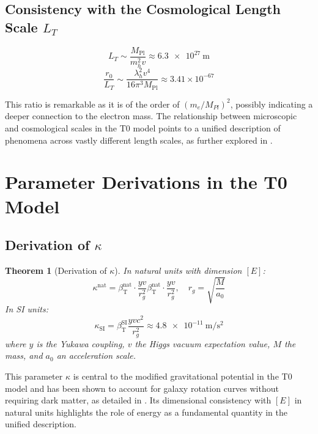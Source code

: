 \documentclass[12pt,a4paper]{article}
\newcommand{\Mpl}{M_{\text{Pl}}}
\newcommand{\betaT}{\beta_{\text{T}}}
\newtheorem{theorem}{Theorem}[section]
\begin{document}
	\subsection{Consistency with the Cosmological Length Scale \(L_T\)}
	\label{subsec:cosmological_scale}
	
	\begin{equation}
		L_T \sim \frac{\Mpl}{m_h^2 v} \approx \SI{6.3e27}{\meter}
	\end{equation}
	\begin{equation}
		\frac{r_0}{L_T} \sim \frac{\lambda_h^2 v^4}{16\pi^3 \Mpl} \approx 3.41 \times 10^{-67}
	\end{equation}
	
	This ratio is remarkable as it is of the order of \((m_e/M_{Pl})^2\), possibly indicating a deeper connection to the electron mass. The relationship between microscopic and cosmological scales in the T0 model points to a unified description of phenomena across vastly different length scales, as further explored in \cite{pascher_vereinheitlichung_2025}.
	
	\section{Parameter Derivations in the T0 Model}
	\label{sec:parameter_derivations}
	
	\subsection{Derivation of \(\kappa\)}
	\label{subsec:kappa_derivation}
	
	\begin{theorem}[Derivation of \(\kappa\)]
		In natural units with dimension \([E]\):
		\begin{equation}
			\kappa^{\text{nat}} = \betaT^{\text{nat}} \cdot \frac{yv}{r_g^2}\betaT^{\text{nat}} \cdot \frac{yv}{r_g^2}, \quad r_g = \sqrt{\frac{M}{a_0}}
		\end{equation}
		In SI units:
		\begin{equation}
			\kappa_{\text{SI}} = \betaT^{\text{SI}} \frac{y v c^2}{r_g^2} \approx \SI{4.8e-11}{\meter\per\second\squared}
		\end{equation}
		where \(y\) is the Yukawa coupling, \(v\) the Higgs vacuum expectation value, \(M\) the mass, and \(a_0\) an acceleration scale.
	\end{theorem}
	
	This parameter \(\kappa\) is central to the modified gravitational potential in the T0 model and has been shown to account for galaxy rotation curves without requiring dark matter, as detailed in \cite{pascher_galaxies_2025}. Its dimensional consistency with \([E]\) in natural units highlights the role of energy as a fundamental quantity in the unified description.
	
\end{document}
